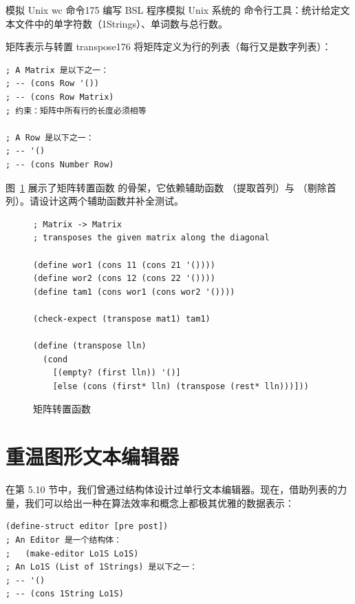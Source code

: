 \begin{exercise}{模拟 Unix wc 命令}{175}
编写 BSL 程序模拟 Unix 系统的  命令行工具：统计给定文本文件中的单字符数（1Strings）、单词数与总行数。
\end{exercise}

\begin{exercise}{矩阵表示与转置 transpose}{176}
将矩阵定义为行的列表（每行又是数字列表）：
\begin{lstlisting}[language=BSL]
; A Matrix 是以下之一：
; -- (cons Row '())
; -- (cons Row Matrix)
; 约束：矩阵中所有行的长度必须相等

; A Row 是以下之一：
; -- '()
; -- (cons Number Row)
\end{lstlisting}
图~\ref{fig:transpose_matrix} 展示了矩阵转置函数  的骨架，它依赖辅助函数 （提取首列）与 （剔除首列）。请设计这两个辅助函数并补全测试。
\end{exercise}

\begin{figure}[htbp]
  \centering
\begin{lstlisting}[language=BSL, basicstyle=\scriptsize\ttfamily]
; Matrix -> Matrix
; transposes the given matrix along the diagonal

(define wor1 (cons 11 (cons 21 '())))
(define wor2 (cons 12 (cons 22 '())))
(define tam1 (cons wor1 (cons wor2 '())))

(check-expect (transpose mat1) tam1)

(define (transpose lln)
  (cond
    [(empty? (first lln)) '()]
    [else (cons (first* lln) (transpose (rest* lln)))]))
\end{lstlisting}
  \caption{矩阵转置函数}
  \label{fig:transpose_matrix}
\end{figure}

\section{重温图形文本编辑器}
\label{sec:ch10_editor_revisited}

在第 5.10 节中，我们曾通过结构体设计过单行文本编辑器。现在，借助列表的力量，我们可以给出一种在算法效率和概念上都极其优雅的数据表示：
\begin{lstlisting}[language=BSL]
(define-struct editor [pre post])
; An Editor 是一个结构体：
;   (make-editor Lo1S Lo1S)
; An Lo1S (List of 1Strings) 是以下之一：
; -- '()
; -- (cons 1String Lo1S)
\end{lstlisting}

